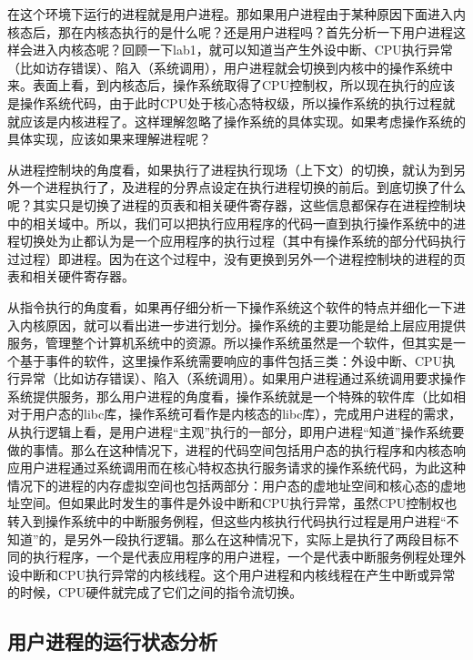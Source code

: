 在这个环境下运行的进程就是用户进程。那如果用户进程由于某种原因下面进入内核态后，那在内核态执行的是什么呢？还是用户进程吗？首先分析一下用户进程这样会进入内核态呢？回顾一下lab1，就可以知道当产生外设中断、CPU执行异常（比如访存错误）、陷入（系统调用），用户进程就会切换到内核中的操作系统中来。表面上看，到内核态后，操作系统取得了CPU控制权，所以现在执行的应该是操作系统代码，由于此时CPU处于核心态特权级，所以操作系统的执行过程就就应该是内核进程了。这样理解忽略了操作系统的具体实现。如果考虑操作系统的具体实现，应该如果来理解进程呢？

从进程控制块的角度看，如果执行了进程执行现场（上下文）的切换，就认为到另外一个进程执行了，及进程的分界点设定在执行进程切换的前后。到底切换了什么呢？其实只是切换了进程的页表和相关硬件寄存器，这些信息都保存在进程控制块中的相关域中。所以，我们可以把执行应用程序的代码一直到执行操作系统中的进程切换处为止都认为是一个应用程序的执行过程（其中有操作系统的部分代码执行过过程）即进程。因为在这个过程中，没有更换到另外一个进程控制块的进程的页表和相关硬件寄存器。

从指令执行的角度看，如果再仔细分析一下操作系统这个软件的特点并细化一下进入内核原因，就可以看出进一步进行划分。操作系统的主要功能是给上层应用提供服务，管理整个计算机系统中的资源。所以操作系统虽然是一个软件，但其实是一个基于事件的软件，这里操作系统需要响应的事件包括三类：外设中断、CPU执行异常（比如访存错误）、陷入（系统调用）。如果用户进程通过系统调用要求操作系统提供服务，那么用户进程的角度看，操作系统就是一个特殊的软件库（比如相对于用户态的libc库，操作系统可看作是内核态的libc库），完成用户进程的需求，从执行逻辑上看，是用户进程``主观''执行的一部分，即用户进程``知道''操作系统要做的事情。那么在这种情况下，进程的代码空间包括用户态的执行程序和内核态响应用户进程通过系统调用而在核心特权态执行服务请求的操作系统代码，为此这种情况下的进程的内存虚拟空间也包括两部分：用户态的虚地址空间和核心态的虚地址空间。但如果此时发生的事件是外设中断和CPU执行异常，虽然CPU控制权也转入到操作系统中的中断服务例程，但这些内核执行代码执行过程是用户进程``不知道''的，是另外一段执行逻辑。那么在这种情况下，实际上是执行了两段目标不同的执行程序，一个是代表应用程序的用户进程，一个是代表中断服务例程处理外设中断和CPU执行异常的内核线程。这个用户进程和内核线程在产生中断或异常的时候，CPU硬件就完成了它们之间的指令流切换。

\subsection{用户进程的运行状态分析}\label{ux7528ux6237ux8fdbux7a0bux7684ux8fd0ux884cux72b6ux6001ux5206ux6790}

